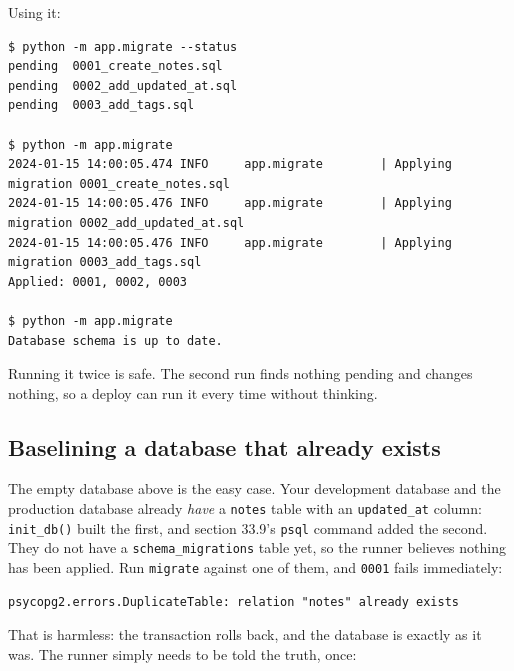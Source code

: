 \noindent{}Using it:

\begin{outputbox}[short]
\begin{Verbatim}[fontsize=\codesize, breaklines, breakanywhere, breaksymbolleft={\tiny\textcolor{muted}{$\hookrightarrow$}}]
$ python -m app.migrate --status
pending  0001_create_notes.sql
pending  0002_add_updated_at.sql
pending  0003_add_tags.sql

$ python -m app.migrate
2024-01-15 14:00:05.474 INFO     app.migrate        | Applying migration 0001_create_notes.sql
2024-01-15 14:00:05.476 INFO     app.migrate        | Applying migration 0002_add_updated_at.sql
2024-01-15 14:00:05.476 INFO     app.migrate        | Applying migration 0003_add_tags.sql
Applied: 0001, 0002, 0003

$ python -m app.migrate
Database schema is up to date.
\end{Verbatim}
\end{outputbox}

\noindent{}Running it twice is safe. The second run finds nothing pending and changes nothing, so a deploy can run it every time without thinking.

\subsection*{Baselining a database that already exists}\label{33-logic-execution:baselining-a-database-that-already-exists}

The empty database above is the easy case. Your development database and the production database already \emph{have} a \texttt{notes} table with an \texttt{updated\_at} column: \texttt{init\_db()} built the first, and section 33.9's \texttt{psql} command added the second. They do not have a \texttt{schema\_migrations} table yet, so the runner believes nothing has been applied. Run \texttt{migrate} against one of them, and \texttt{0001} fails immediately:

\begin{outputbox}[short]
\begin{Verbatim}[fontsize=\codesize, breaklines, breakanywhere, breaksymbolleft={\tiny\textcolor{muted}{$\hookrightarrow$}}]
psycopg2.errors.DuplicateTable: relation "notes" already exists
\end{Verbatim}
\end{outputbox}

\noindent{}That is harmless: the transaction rolls back, and the database is exactly as it was. The runner simply needs to be told the truth, once:

